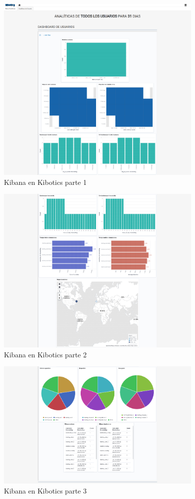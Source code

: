 \documentclass[11pt,a4paper]{book}
\begin{document}
				\begin{figure}[H]
					\centering
					\includegraphics[width=10cm, keepaspectratio]{img/kibana_kibotics_01.png}
					\caption{Kibana en Kibotics parte 1}
					\label{fig:kibana_kibotics_01}
				\end{figure}
				\begin{figure}[H]
					\centering
					\includegraphics[width=10cm, keepaspectratio]{img/kibana_kibotics_02.png}
					\caption{Kibana en Kibotics parte 2}
					\label{fig:kibana_kibotics_02}
				\end{figure}
				\begin{figure}[H]
					\centering
					\includegraphics[width=10cm, keepaspectratio]{img/kibana_kibotics_03.png}
					\caption{Kibana en Kibotics parte 3}
					\label{fig:kibana_kibotics_03}
				\end{figure}
\end{document}
